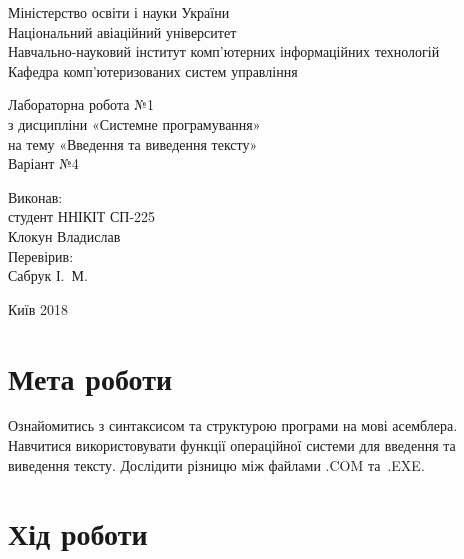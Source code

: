 \documentclass[a4paper,oneside,DIV=12,12pt,headings=normal]{scrartcl}
\begin{document}
	\begin{titlepage}
	\centering
		Міністерство освіти і науки України\\
		Національний авіаційний університет\\
		Навчально-науковий інститут комп'ютерних інформаційних технологій\\
		Кафедра комп'ютеризованих систем управління

		\vspace*{\fill}

		Лабораторна робота №1\\
		з дисципліни «Системне програмування»\\
		на тему «Введення та виведення тексту»\\
		Варіант №4

		\vspace*{\fill}
		
		\begin{flushright}
			Виконав:\\
			студент ННІКІТ СП-225\\
			Клокун Владислав\\
			Перевірив:\\
			Сабрук І.~М.
		\end{flushright}

		Київ 2018
    \end{titlepage}
	
	\section{Мета роботи}
		Ознайомитись з синтаксисом та структурою програми на мові асемблера. Навчитися використовувати функції операційної системи для введення та виведення тексту. Дослідити різницю між файлами .COM та~.EXE.
		
	\section{Хід роботи}
				
				
\end{document}
